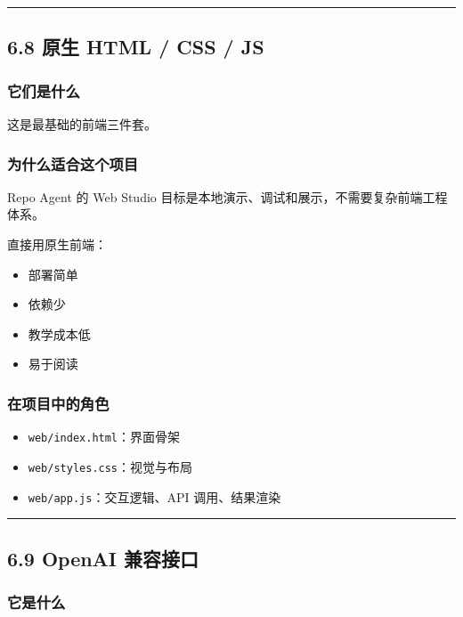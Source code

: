 \documentclass[UTF8,12pt,openany]{ctexbook}
\begin{document}
\hrule

\subsection{6.8 原生 HTML / CSS / JS}

\subsubsection{它们是什么}

这是最基础的前端三件套。\par

\subsubsection{为什么适合这个项目}

Repo Agent 的 Web Studio 目标是本地演示、调试和展示，不需要复杂前端工程体系。  \par
直接用原生前端：\par

\begin{itemize}
\item 部署简单
\item 依赖少
\item 教学成本低
\item 易于阅读
\end{itemize}

\subsubsection{在项目中的角色}

\begin{itemize}
\item \texttt{web/index.html}：界面骨架
\item \texttt{web/styles.css}：视觉与布局
\item \texttt{web/app.js}：交互逻辑、API 调用、结果渲染
\end{itemize}

\hrule

\subsection{6.9 OpenAI 兼容接口}

\subsubsection{它是什么}
\end{document}
